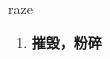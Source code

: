 
\begin{frame}
{\huge raze}
\begin{center}
\begin{enumerate}\Large
  \item \textbf{摧毁，粉碎}
\end{enumerate}
\end{center}
\end{frame}
